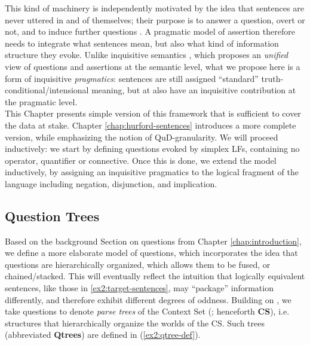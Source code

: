 This kind of machinery is independently motivated by the idea that sentences are never uttered in and of themselves; their purpose is to answer a question, overt or not, and to induce further questions \cite{Roberts1996}. A pragmatic model of assertion therefore needs to integrate what sentences mean, but also what kind of information structure they evoke. Unlike inquisitive semantics \citep{Mascarenhas2008,Ciardelli2009,Groenendijk2009,Ciardelli2018}, which proposes an \textit{unified} view of questions and assertions at the semantic level, what we propose here is a form of inquisitive \textit{pragmatics}: sentences are still assigned ``standard'' truth-conditional/intensional meaning, but at also have an inquisitive contribution at the pragmatic level.\\

This Chapter presents simple version of this framework that is sufficient to cover the data at stake. Chapter \ref{chap:hurford-sentences} introduces a more complete version, while emphasizing the notion of QuD-granularity. We will proceed inductively: we start by defining questions evoked by simplex LFs, containing no operator, quantifier or connective. Once this is done, we extend the model inductively, by assigning an inquisitive pragmatics to the logical fragment of the language including negation, disjunction, and implication.



\subsection{Question Trees}

Based on the background Section on questions from Chapter \ref{chap:introduction}, we define a more elaborate model of questions, which incorporates the idea that questions are hierarchically organized, which allows them to be fused, or chained/stacked. This will eventually reflect the intuition that logically equivalent sentences, like those in \ref{ex2:target-sentences}, may ``package'' information differently, and therefore exhibit different degrees of oddness. Building on \citet{Buring2003,Riester2019,Onea2016,Zhang2022}, we take questions to denote \textit{parse trees} of the Context Set (; henceforth \textbf{CS}), i.e. structures that hierarchically organize the worlds of the CS. Such trees (abbreviated \textbf{Qtrees}) are defined in (\ref{ex2:qtree-def}).

\begin{exe}
	\label{ex2:qtree-def}
\end{exe}


